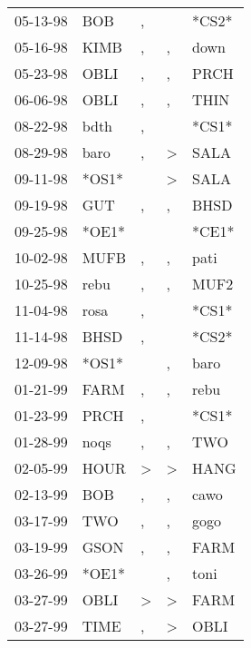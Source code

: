 \begin{supertabular}{lllll}
 05-13-98 &    BOB &                , &                  &  *CS2* \\
 05-16-98 &   KIMB &                , &                , &   down \\
 05-23-98 &   OBLI &                , &                , &   PRCH \\
 06-06-98 &   OBLI &                , &                , &   THIN \\
 08-22-98 &   bdth &                , &                  &  *CS1* \\
 08-29-98 &   baro &                , &     \textgreater &   SALA \\
 09-11-98 &  *OS1* &                  &     \textgreater &   SALA \\
 09-19-98 &    GUT &                , &                , &   BHSD \\
 09-25-98 &  *OE1* &                  &                  &  *CE1* \\
 10-02-98 &   MUFB &                , &                , &   pati \\
 10-25-98 &   rebu &                , &                , &   MUF2 \\
 11-04-98 &   rosa &                , &                  &  *CS1* \\
 11-14-98 &   BHSD &                , &                  &  *CS2* \\
 12-09-98 &  *OS1* &                  &                , &   baro \\
 01-21-99 &   FARM &                , &                , &   rebu \\
 01-23-99 &   PRCH &                , &                  &  *CS1* \\
 01-28-99 &   noqs &                , &                , &    TWO \\
 02-05-99 &   HOUR &     \textgreater &     \textgreater &   HANG \\
 02-13-99 &    BOB &                , &                , &   cawo \\
 03-17-99 &    TWO &                , &                , &   gogo \\
 03-19-99 &   GSON &                , &                , &   FARM \\
 03-26-99 &  *OE1* &                  &                , &   toni \\
 03-27-99 &   OBLI &     \textgreater &     \textgreater &   FARM \\
 03-27-99 &   TIME &                , &     \textgreater &   OBLI \\

\end{supertabular}
